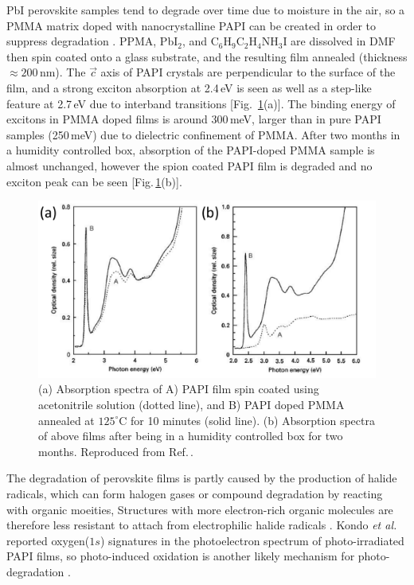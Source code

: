 PbI perovskite samples tend to degrade over time due to moisture in the air, so a PMMA matrix doped with nanocrystalline PAPI can be created in order to suppress degradation \cite{Kitazawa1998}. PPMA, Pb$\textrm{I}_2$, and $\textrm{C}_6\textrm{H}_9\textrm{C}_2\textrm{H}_4\textrm{NH}_3\textrm{I}$ are dissolved in DMF then spin coated onto a glass substrate, and the resulting film annealed (thickness $\approx200$\,nm). The $\vec{c}$ axis of PAPI crystals are perpendicular to the surface of the film, and a strong exciton absorption at 2.4\,eV is seen as well as a step-like feature at 2.7\,eV due to interband transitions [Fig.\ \ref{2Fig10}(a)]. The binding energy of excitons in PMMA doped films is around 300\,meV, larger than in pure PAPI samples (250\,meV) due to dielectric confinement of PMMA. After two months in a humidity controlled box, absorption of the PAPI-doped PMMA sample is almost unchanged, however the spion coated PAPI film is degraded and no exciton peak can be seen [Fig.\,\ref{2Fig10}(b)].
\begin{figure}
\centering
\includegraphics[width=\textwidth]{Fig10}
\caption{ (a) Absorption spectra of A) PAPI film spin coated using acetonitrile solution (dotted line), and B) PAPI doped PMMA annealed at $125^{\circ}$C for 10 minutes (solid line). (b) Absorption spectra of above films after being in a humidity controlled box for two months. Reproduced from Ref.\,\cite{Kitazawa1998}.}
\label{2Fig10}
\end{figure}

The degradation of perovskite films is partly caused by the production of halide radicals, which can form halogen gases or compound degradation by reacting with organic moeities, Structures with more electron-rich organic molecules are therefore less resistant to attach from electrophilic halide radicals \cite{Wei2014}. Kondo \textit{et al.} reported oxygen($1s$) signatures in the photoelectron spectrum of photo-irradiated PAPI films, so photo-induced oxidation is another likely mechanism for photo-degradation \cite{Kitazawa2002}.

